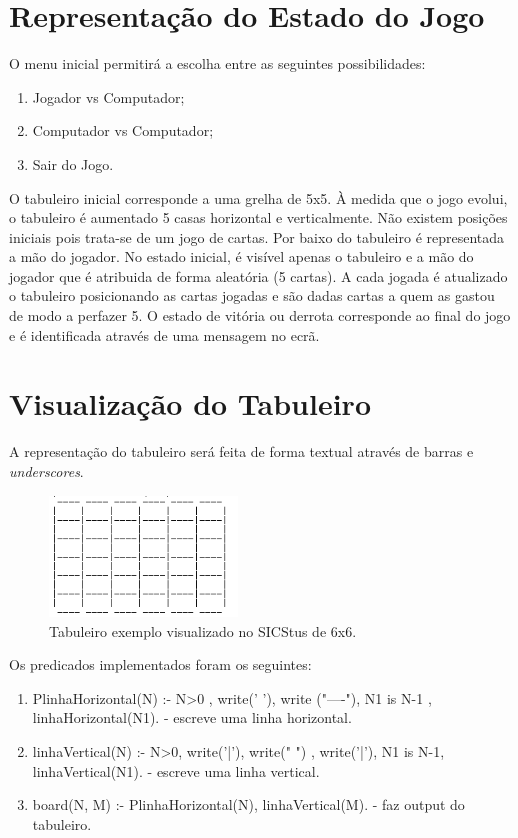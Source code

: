 \documentclass[a4paper]{article}
\begin{document}
\section{Representação do Estado do Jogo}

O menu inicial permitirá a escolha entre as seguintes possibilidades:

\begin{enumerate}
	\item Jogador vs Computador;
	\item Computador vs Computador;
	\item Sair do Jogo. 
\end{enumerate}

\par
O tabuleiro inicial corresponde a uma grelha de 5x5. À medida que o jogo evolui, o tabuleiro é aumentado 5 casas horizontal e verticalmente. Não existem posições iniciais pois trata-se de um jogo de cartas. Por baixo do tabuleiro é representada a mão do jogador. No estado inicial, é visível apenas o tabuleiro e a mão do jogador que é atribuida de forma aleatória (5 cartas). A cada jogada é atualizado o tabuleiro posicionando as cartas jogadas e são dadas cartas a quem as gastou de modo a perfazer 5. O estado de vitória ou derrota corresponde ao final do jogo e é identificada através de uma mensagem no ecrã.

\section{Visualização do Tabuleiro}

A representação do tabuleiro será feita de forma textual através de barras e \textit{underscores}.

\begin{figure}[h!]
\centering
\includegraphics[width=50mm]{board.jpg}
\caption{Tabuleiro exemplo visualizado no SICStus de 6x6. \label{board}}
\end{figure}

Os predicados implementados foram os seguintes:

\begin{enumerate}
	\item PlinhaHorizontal(N) :- N>0 , write(' '), write ("----"), N1 is N-1 , linhaHorizontal(N1).
		\subitem  - escreve uma linha horizontal.
	\item linhaVertical(N) :- N>0, write('|'), write("    ") , write('|'), N1 is N-1, linhaVertical(N1).
		\subitem  - escreve uma linha vertical.
	\item board(N, M) :- PlinhaHorizontal(N), linhaVertical(M).
		\subitem  - faz output do tabuleiro. 
\end{enumerate}
\end{document}
